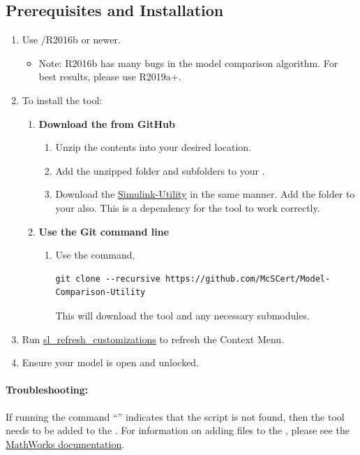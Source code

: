 \documentclass{article}
\begin{document}
\subsection{Prerequisites and Installation}

\begin{enumerate}
  \item Use \Matlab/\Simulink R2016b or newer.
		\begin{itemize}
			\item Note: R2016b has many bugs in the model comparison algorithm. For best results, please use R2019a+.
		\end{itemize}
	\item To install the tool:
	\begin{enumerate}
		\item \textbf{Download the  from GitHub}
		\begin{enumerate} 
			\item Unzip the contents into your desired location. 
			\item Add the unzipped folder and subfolders to your \mpath. 
			\item Download the \href{https://github.com/McSCert/Simulink-Utility}{Simulink-Utility} in the same manner. Add the folder to your \mpath also. This is a dependency for the tool to work correctly.
		\end{enumerate}
		\item \textbf{Use the Git command line}
			\begin{enumerate}
				\item Use the command, \begin{verbatim}git clone --recursive https://github.com/McSCert/Model-Comparison-Utility\end{verbatim} This will download the tool and any necessary submodules.
			\end{enumerate}
	\end{enumerate}
	\item Run \href{https://www.mathworks.com/help/simulink/ug/registering-customizations.html}{sl\_refresh\_customizations} to refresh the Context Menu. 
	\item Ensure your model is open and unlocked.
\end{enumerate}

\paragraph{Troubleshooting:} If running the command ``'' indicates that the script is not found, then the tool needs to be added to the \mpath.
		For information on adding files to the \mpath, please see the \href{https://www.mathworks.com/help/matlab/matlab_env/add-remove-or-reorder-folders-on-the-search-path.html}{MathWorks documentation}.
\end{document}
